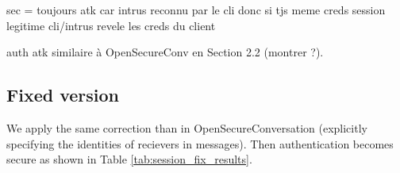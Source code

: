 \TODO sec = toujours atk car intrus reconnu par le cli donc si tjs meme creds session legitime cli/intrus revele les creds du client

\TODO auth atk similaire à OpenSecureConv en Section 2.2 (montrer ?). 

\subsection{Fixed version}

We apply the same correction than in OpenSecureConversation (explicitly
specifying the identities of recievers in messages).
Then authentication becomes secure as shown in Table \ref{tab:session_fix_results}.

%
%
%                
%
%                
%                
%                
%
%

